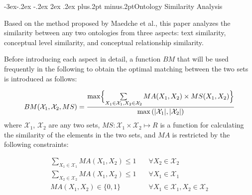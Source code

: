 \documentclass[twoside]{article}
\makeatletter
\def\subsection{\@startsection{subsection}{2}{\z@}%
 {-3ex\@plus -.2ex \@minus -.2ex}%
 {2ex \@plus.2ex}%
{\normalfont\normalsize\protect\baselineskip=12.5pt plus.2pt minus.2pt\bfseries}}
\makeatother
\begin{document}
\subsection{Ontology Similarity Analysis}

Based on the method proposed by Maedche et al.\cite{wwy51}, this paper analyzes the similarity between any two ontologies from three aspects: text similarity, conceptual level similarity, and conceptual relationship similarity.

Before introducing each aspect in detail, a function $BM$ that will be used frequently in the following to obtain the optimal matching between the two sets is introduced as follows:


\begin{equation}
BM(\mathcal{X}_1, \mathcal{X}_2, MS) = \frac{\max\Bigl\{\sum\limits_{X_1 \in \mathcal{X}_1, X_2 \in \mathcal{X}_2}MA(X_1, X_2) \times MS(X_1, X_2)\Bigr\}}{\max{(|\mathcal{X}_1|,|\mathcal{X}_2|)}}
\end{equation}
where $\mathcal{X}_{1}$, $\mathcal{X}_{2}$ are any two sets, $MS: \mathcal{X}_{1} \times \mathcal{X}_{2} \mapsto R$ is a function for calculating the similarity of the elements in the two sets, and $MA$ is restricted by the following constraints:

\begin{equation}
\begin{split}
\sum_{X_{1} \in \mathcal{X}_{1}} M A\left(X_{1}, X_{2}\right) \leqslant 1 \quad &\forall X_{2} \in \mathcal{X}_{2} \\
\sum_{X_{2} \in \mathcal{X}_{2}} M A\left(X_{1}, X_{2}\right) \leqslant 1 \quad &\forall X_{1} \in \mathcal{X}_{1} \\
MA\left(X_{1}, X_{2}\right) \in\{0,1\} \quad &\forall X_{1} \in \mathcal{X}_{1}, X_{2} \in \mathcal{X}_{2}         \\
\end{split}
\end{equation}
\end{document}
